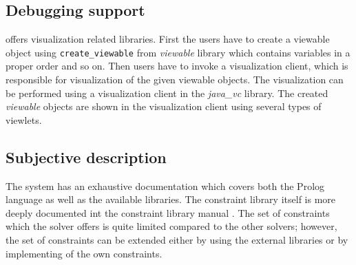 \subsection{Debugging support}
\eclipse offers visualization related libraries. First the users have to create a 
viewable object using \texttt{create\_viewable} from {\em viewable} library which 
contains variables in a proper order and so on. Then
users have to invoke a visualization client, which is responsible for visualization of the 
given viewable objects. The visualization can be performed using a visualization client
in the {\em java\_vc} library. The created {\em viewable} objects are shown in
the visualization client using several types of viewlets.  


\subsection{Subjective description}
The \eclipse system has an exhaustive documentation \cite{eclipse:tutorial} which covers both the Prolog language
as well as the available libraries. The constraint library itself is more deeply documented
int the constraint library manual \cite{eclipse:cspmanual}. The set of constraints which the solver offers
is quite limited compared to the other solvers; however, the set of constraints can be extended 
either by using the external libraries or by implementing of the own constraints.

 